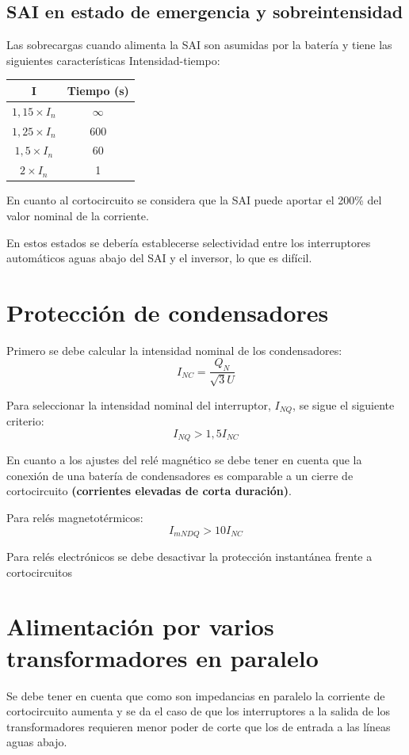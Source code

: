\subsection{SAI en estado de emergencia y sobreintensidad}
Las sobrecargas cuando alimenta la SAI son asumidas por la batería y tiene las siguientes características Intensidad-tiempo:
\begin{table}[H]
	\centering
	\begin{tabular}{|c|c|}
		\hline
		\textbf{I}            & \textbf{Tiempo (s)} \\ \hline
		$1,15\times I_n$           & $\infty$                               \\ \hline
		$1,25\times I_n$             & 600                                \\ \hline
		$1,5\times I_n$              & 60                                \\ \hline
		$2\times I_n$              & 1                              \\ \hline
	\end{tabular}
\end{table}

En cuanto al cortocircuito se considera que la SAI puede aportar el 200\% del valor nominal de la corriente.
\newline

En estos estados se debería establecerse selectividad entre los interruptores automáticos aguas abajo del SAI y el inversor, lo que es difícil.
\section{Protección de condensadores}
Primero se debe calcular la intensidad nominal de los condensadores:
\begin{equation}
	I_{NC}=\dfrac{Q_N}{\sqrt{3}U}
\end{equation}

Para seleccionar la intensidad nominal del interruptor, $I_{NQ}$, se sigue el siguiente criterio:
\begin{equation}
	I_{NQ}> 1,5 I_{NC} 
\end{equation}

En cuanto a los ajustes del relé magnético se debe tener en cuenta que la conexión de una batería de condensadores es comparable a un cierre de cortocircuito \textbf{(corrientes elevadas de corta duración)}.
\newline

Para relés magnetotérmicos:
\begin{equation}
	I_{mNDQ}>10 I_{NC}
\end{equation}

Para relés electrónicos se debe desactivar la protección instantánea frente a cortocircuitos
\section{Alimentación por varios transformadores en paralelo}
Se debe tener en cuenta que como son impedancias en paralelo la corriente de cortocircuito aumenta y se da el caso de que los interruptores a la salida de los transformadores requieren menor poder de corte que los de entrada a las líneas aguas abajo.